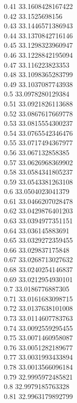 {0.41	33.1608428167422\\
0.42	33.1525698156\\
0.43	33.1446571386943\\
0.44	33.1370842716146\\
0.45	33.1298323960947\\
0.46	33.1228842195094\\
0.47	33.116223823353\\
0.48	33.1098365283799\\
0.49	33.1037087743938\\
0.5	33.0978280129384\\
0.51	33.0921826113688\\
0.52	33.0867617669778\\
0.53	33.0815554300237\\
0.54	33.0765542346476\\
0.55	33.0717494367977\\
0.56	33.067132858385\\
0.57	33.0626968369902\\
0.58	33.0584341805237\\
0.59	33.0543381263108\\
0.6	33.0504023041379\\
0.61	33.0466207028478\\
0.62	33.0429876401203\\
0.63	33.0394977351151\\
0.64	33.036145883691\\
0.65	33.0329272359455\\
0.66	33.029837175848\\
0.67	33.0268713027632\\
0.68	33.0240254146837\\
0.69	33.0212954930101\\
0.7	33.0186776887305\\
0.71	33.0161683098715\\
0.72	33.0137638101008\\
0.73	33.0114607783763\\
0.74	33.0092559295455\\
0.75	33.0071460958087\\
0.76	33.0051282189677\\
0.77	33.0031993433894\\
0.78	33.0013566096184\\
0.79	32.9995972485821\\
0.8	32.9979185763328\\
0.81	32.9963179892799\\
}
